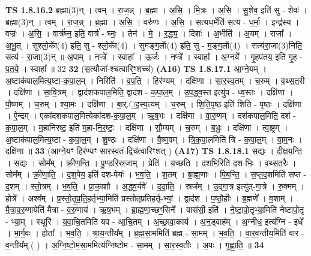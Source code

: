 \documentclass[17pt]{extarticle}
\begin{document}
                  \newline
                                \textbf{ TS 1.8.16.2} \newline
                  ब्रह्मा(3)न् । त्वम् । रा॒ज॒न्न् । ब्र॒ह्मा । अ॒सि॒ । मि॒त्रः । अ॒सि॒ । सु॒शेव॒ इति॑ सु - शेवः॑ । ब्रह्मा(3)न् । त्वम् । रा॒ज॒न्न् । ब्र॒ह्मा । अ॒सि॒ । वरु॑णः । अ॒सि॒ । स॒त्यध॒र्मेति॑ स॒त्य - ध॒र्मा॒ । इन्द्र॑स्य । वज्रः॑ । अ॒सि॒ । वार्त्र॑घ्न॒ इति॒ वार्त्र॑ - घ्नः॒ । तेन॑ । मे॒ । र॒द्ध्य॒ । दिशः॑ । अ॒भीति॑ । अ॒यम् । राजा᳚ । अ॒भू॒त् । सुश्लो॒काॅ(4) इति॒ सु - श्लो॒काॅ(4) । सुम॑ङ्ग॒लाॅ(4) इति॒ सु - म॒ङ्ग॒लाॅ(4) । सत्य॑रा॒जा(3)निति॒ सत्य॑ - रा॒जा(3)न् ॥ अ॒पाम् । नप्त्रे᳚ । स्वाहा᳚ । ऊ॒र्जः । नप्त्रे᳚ । स्वाहा᳚ । अ॒ग्नये᳚ । गृ॒हप॑तय॒ इति॑ गृ॒ह - प॒त॒ये॒ । स्वाहा᳚ ॥ 32 \textbf{  32 } \newline
                  \newline
                      (स॒त्यौजा᳚-श्चत्वारिꣳ॒॒शच्च॑)  \textbf{(A16)} \newline \newline
                                \textbf{ TS 1.8.17.1} \newline
                  आ॒ग्ने॒यम् । अ॒ष्टाक॑पाल॒मित्य॒ष्टा-क॒पा॒ल॒म् । निरिति॑ । व॒प॒ति॒ । हिर॑ण्यम् । दक्षि॑णा । सा॒र॒स्व॒तम् । च॒रुम् । व॒थ्स॒त॒री । दक्षि॑णा । सा॒वि॒त्रम् । द्वाद॑शकपाल॒मिति॒ द्वाद॑श - क॒पा॒ल॒म् । उ॒प॒द्ध्व॒स्त इत्यु॑प - ध्व॒स्तः । दक्षि॑णा । पौ॒ष्णम् । च॒रुम् । श्या॒मः । दक्षि॑णा । बा॒र्.॒ह॒स्प॒त्यम् । च॒रुम् । शि॒ति॒पृ॒ष्ठ इति॑ शिति - पृ॒ष्ठः । दक्षि॑णा । ऐ॒न्द्रम् । एका॑दशकपाल॒मित्येका॑दश-क॒पा॒ल॒म् । ऋ॒ष॒भः । दक्षि॑णा । वा॒रु॒णम् । दश॑कपाल॒मिति॒ दश॑ - क॒पा॒ल॒म् । म॒हानि॑रष्ट॒ इति॑ म॒हा-नि॒र॒ष्टः॒ । दक्षि॑णा । सौ॒म्यम् । च॒रुम् । ब॒भ्रुः । दक्षि॑णा । त्वा॒ष्ट्रम् । अ॒ष्टाक॑पाल॒मित्य॒ष्टा - क॒पा॒ल॒म् । शु॒ण्ठः । दक्षि॑णा । वै॒ष्ण॒वम् । त्रि॒क॒पा॒लमिति॑ त्रि - क॒पा॒ल॒म् । वा॒म॒नः । दक्षि॑णा ॥ \textbf{  33} \newline
                  \newline
                      (आ॒ग्ने॒यꣳ हिर॑ण्यꣳ सारस्व॒तं-द्विच॑त्वारिꣳशत् )  \textbf{(A17)} \newline \newline
                                \textbf{ TS 1.8.18.1} \newline
                  स॒द्यः । दी॒क्ष॒य॒न्ति॒ । स॒द्यः । सोम᳚म् । क्री॒ण॒न्ति॒ । पु॒ण्ड॒रि॒स्र॒जाम् । प्रेति॑ । य॒च्छ॒ति॒ । द॒शभि॒रिति॑ द॒श-भिः॒ । व॒थ्स॒त॒रैः । सोम᳚म् । क्री॒णा॒ति॒ । द॒श॒पेय॒ इति॑ दश-पेयः॑ । भ॒व॒ति॒ । श॒तम् । ब्रा॒ह्म॒णाः । पि॒ब॒न्ति॒ । स॒प्त॒द॒शमिति॑ सप्त - द॒शम् । स्तो॒त्रम् । भ॒व॒ति॒ । प्रा॒का॒शौ । अ॒द्ध्व॒र्यवे᳚ । द॒दा॒ति॒ । स्रज᳚म् । उ॒द्गा॒त्र इत्यु॑त्-गा॒त्रे । रु॒क्मम् । होत्रे᳚ । अश्व᳚म् । प्र॒स्तो॒तृ॒प्र॒ति॒ह॒र्तृभ्या॒मिति॑ प्रस्तोतृप्रतिह॒र्तृ-भ्यां॒ । द्वाद॑श । प॒ष्ठौ॒हीः । ब्र॒ह्मणे᳚ । व॒शाम् । मै॒त्रा॒व॒रु॒णायेति॑ मैत्रा - व॒रु॒णाय॑ । ऋ॒ष॒भम् । ब्रा॒ह्म॒णा॒च्छꣳ॒॒सिने᳚ । वास॑सी॒ इति॑ । ने॒ष्टा॒पो॒तृभ्या॒मिति॑ नेष्टापो॒तृ - भ्या॒म् । स्थूरि॑ । य॒वा॒चि॒तमिति॑ यव - आ॒चि॒तम् । अ॒च्छा॒वा॒काय॑ । अ॒न॒ड्वाह᳚म् । अ॒ग्नीध॒ इत्य॑ग्नि - इधे᳚ । भा॒र्ग॒वः । होता᳚ । भ॒व॒ति॒ । श्रा॒य॒न्तीय᳚म् । ब्र॒ह्म॒सा॒ममिति॑ ब्रह्म - सा॒मम् । भ॒व॒ति॒ । वा॒र॒व॒न्तीय॒मिति॑ वार - व॒न्तीय᳚म् ( ) । अ॒ग्नि॒ष्टो॒म॒सा॒ममित्य॑ग्निष्टोम - सा॒मम् । सा॒र॒स्व॒तीः । अ॒पः । गृ॒ह्णा॒ति॒ ॥ \textbf{  34 } \newline
\end{document}
